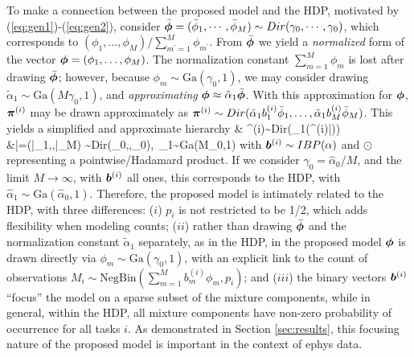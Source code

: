 \documentclass[journal]{IEEEtran}
\begin{document}
To make a connection between the proposed model and the HDP, motivated by (\ref{eq:gen1})-(\ref{eq:gen2}), consider $\bar{\boldsymbol{\phi}}=(\bar{\phi}_1,\cdots,\bar{\phi}_M) \sim \relax{Dir}(\gamma_0,\cdots,\gamma_0)$, which corresponds to $(\phi_1,\dots,\phi_M)/\sum_{m^\prime=1}^M \phi_{m^\prime}$. From $\bar{\boldsymbol{\phi}}$ we yield a \emph{normalized} form of the vector $\boldsymbol{\phi}=(\phi_1,\dots,\phi_M)$. The normalization constant $\sum_{m=1}^M\phi_m$ is lost after drawing $\bar{\boldsymbol{\phi}}$; however, because $\phi_m\sim\mbox{Ga}(\gamma_0,1)$, we may consider drawing $\tilde{\alpha}_1\sim\mbox{Ga}(M\gamma_0,1)$, and \emph{approximating} ${\boldsymbol{\phi}}\approx\tilde{\alpha}_1\bar{\boldsymbol{\phi}}$. With this approximation for $\boldsymbol{\phi}$, $\boldsymbol{\pi}^{(i)}$ may be drawn approximately as $\boldsymbol{\pi}^{(i)}\sim\relax{Dir}(\tilde{\alpha}_1b_1^{(i)}\bar{\phi}_1,\dots,\tilde{\alpha}_1b_M^{(i)}\bar{\phi}_M)$. This yields a simplified and approximate hierarchy
\beqs & \piv^{(i)}\sim\mbox{Dir}(\tilde{\alpha}_1(\bv^{(i)}\odot\bar{\phiv}))\\ &\bar{\phiv}=(\bar{\phi}_1,\cdots,\bar{\phi}_M) \sim \mbox{Dir}(\gamma_0,\cdots,\gamma_0),~\tilde{\alpha}_1\sim\mbox{Ga}(M\gamma_0,1)\nonumber\eeqs
with $\boldsymbol{b}^{(i)}\sim\relax{IBP}(\alpha)$ and $\odot$ representing a pointwise/Hadamard product. If we consider $\gamma_0=\hat{\alpha}_0/M$, and the limit $M\rightarrow\infty$, with $\boldsymbol{b}^{(i)}$ all ones, this corresponds to the HDP, with $\hat{\alpha}_1\sim\mbox{Ga}(\hat{\alpha}_0,1)$. Therefore, the proposed model is intimately related to the HDP, with three differences: ($i$) $p_i$ is not restricted to be 1/2, which adds flexibility when modeling counts; ($ii$) rather than drawing $\bar{\boldsymbol{\phi}}$ and the normalization constant $\tilde{\alpha}_1$ separately, as in the HDP, in the proposed model $\boldsymbol{\phi}$ is drawn directly via $\phi_m\sim\mbox{Ga}(\gamma_0,1)$, with an explicit link to the count of observations $M_i\sim\mbox{NegBin}(\sum_{m=1}^Mb_m^{(i)}\phi_m,p_i)$; and ($iii$) the binary vectors $\boldsymbol{b}^{(i)}$ ``focus'' the model on a sparse subset of the mixture components, while in general, within the HDP, all mixture components have non-zero probability of occurrence for all tasks $i$. As demonstrated in Section \ref{sec:results}, this focusing nature of the proposed model is important in the context of ephys data.
\end{document}
